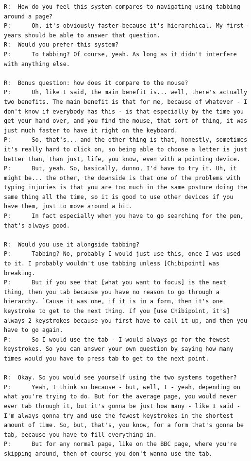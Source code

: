 \documentclass[a4paper, 12pt]{report}
\begin{document}
\begin{lstlisting}[caption={Transcript of Usability Study}, label={lst:usabilityTrans}, style=basic, language=custom, flexiblecolumns=true]
R:	How do you feel this system compares to navigating using tabbing around a page?
P:		Oh, it's obviously faster because it's hierarchical. My first-years should be able to answer that question.
R:	Would you prefer this system?
P:		To tabbing? Of course, yeah. As long as it didn't interfere with anything else.

R:	Bonus question: how does it compare to the mouse?
P:		Uh, like I said, the main benefit is... well, there's actually two benefits. The main benefit is that for me, because of whatever - I don't know if everybody has this - is that especially by the time you get your hand over, and you find the mouse, that sort of thing, it was just much faster to have it right on the keyboard.
P:		So, that's... and the other thing is that, honestly, sometimes it's really hard to click on, so being able to choose a letter is just better than, than just, life, you know, even with a pointing device.
P:		But, yeah. So, basically, dunno, I'd have to try it. Uh, it might be... the other, the downside is that one of the problems with typing injuries is that you are too much in the same posture doing the same thing all the time, so it is good to use other devices if you have them, just to move around a bit.
P:		In fact especially when you have to go searching for the pen, that's always good.

R:	Would you use it alongside tabbing?
P:		Tabbing? No, probably I would just use this, once I was used to it. I probably wouldn't use tabbing unless [Chibipoint] was breaking.
P:		But if you see that [what you want to focus] is the next thing, then you tab because you have no reason to go through a hierarchy. `Cause it was one, if it is in a form, then it's one keystroke to get to the next thing. If you [use Chibipoint, it's] always 2 keystrokes because you first have to call it up, and then you have to go again.
P:		So I would use the tab - I would always go for the fewest keystrokes. So you can answer your own question by saying how many times would you have to press tab to get to the next point.

R:	Okay. So you would see yourself using the two systems together?
P:		Yeah, I think so because - but, well, I - yeah, depending on what you're trying to do. But for the average page, you would never ever tab through it, but it's gonna be just how many - like I said - I'm always gonna try and use the fewest keystrokes in the shortest amount of time. So, but, that's, you know, for a form that's gonna be tab, because you have to fill everything in.
P:		But for any normal page, like on the BBC page, where you're skipping around, then of course you don't wanna use the tab.


\end{lstlisting}
\end{document}
